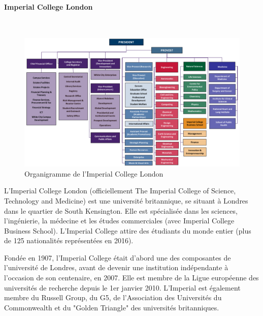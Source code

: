 \documentclass[10pt]{report}
\begin{document}
	\paragraph{Imperial College London}~\par
		\begin{figure}[h!]
			\begin{center}
				\includegraphics[width=18cm]{Reports/figures/College-Organisation.pdf}
			\end{center}	
			\caption{Organigramme de l'Imperial College London}
			\label{Organigramme de l'Imperial College London}
		\end{figure}
	L’Imperial College London (officiellement The Imperial College of Science, Technology and Medicine) est une université britannique, se situant à Londres dans le quartier de South Kensington. Elle est spécialisée dans les sciences, l'ingénierie, la médecine et les études commerciales (avec Imperial College Business School). L'Imperial College attire des étudiants du monde entier (plus de 125 nationalités représentées en 2016).
	
	Fondée en 1907, l'Imperial College était d'abord une des composantes de l’université de Londres, avant de devenir une institution indépendante à l'occasion de son centenaire, en 2007. Elle est membre de la Ligue européenne des universités de recherche depuis le 1er janvier 2010. L'Imperial est également membre du Russell Group, du G5, de l'Association des Universités du Commonwealth et du "Golden Triangle" des universités britanniques.
	
\end{document}
